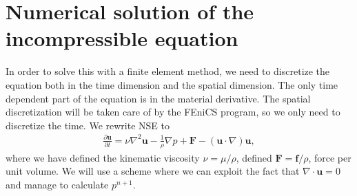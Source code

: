 \documentclass[a4paper,10pt]{article}
\renewcommand{\vec}[1]{\mathbf{#1}}
\renewcommand{\(}{\left(}
\renewcommand{\)}{\right)}
\newcommand{\dpart}[2]{\frac{\partial#1}{\partial#2}}
\begin{document}
\section{Numerical solution of the incompressible equation}
In order to solve this with a finite element method, we need to discretize the equation both in the time dimension and the spatial dimension. The only time dependent part of the equation is in the material derivative. The spatial discretization will be taken care of by the FEniCS program, so we only need to discretize the time. We rewrite NSE to
\begin{align*}
  \dpart{\vec u}{t} = \nu\nabla^2\vec u - \frac{1}{\rho}\nabla p + \vec F - (\vec u\cdot \nabla)\vec u,
\end{align*}
where we have defined the kinematic viscosity $\nu=\mu/\rho$, defined $\vec F = \vec f/\rho$, force per unit volume. We will use a scheme where we can exploit the fact that $\nabla \cdot \vec u = 0$ and manage to calculate $p^{n+1}$.
\end{document}
